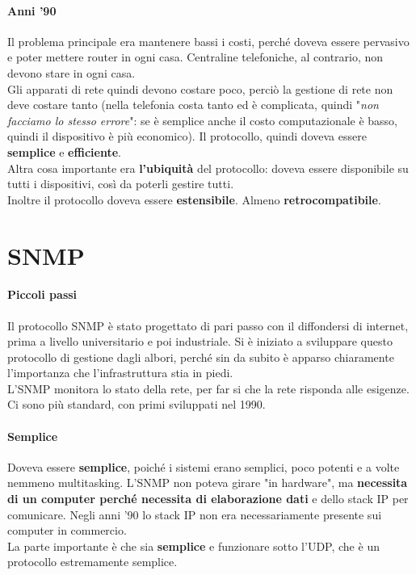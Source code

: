 \documentclass[10pt]{book}
\begin{document}
\paragraph{Anni '90} Il problema principale era mantenere bassi i costi, perché doveva essere pervasivo e poter mettere router in ogni casa. Centraline telefoniche, al contrario, non devono stare in ogni casa.\\
Gli apparati di rete quindi devono costare poco, perciò la gestione di rete non deve costare tanto (nella telefonia costa tanto ed è complicata, quindi "\textit{non facciamo lo stesso errore}": se è semplice anche il costo computazionale è basso, quindi il dispositivo è più economico). Il protocollo, quindi doveva essere \textbf{semplice} e \textbf{efficiente}.\\
Altra cosa importante era \textbf{l'ubiquità} del protocollo: doveva essere disponibile su tutti i dispositivi, così da poterli gestire tutti.\\
Inoltre il protocollo doveva essere \textbf{estensibile}. Almeno \textbf{retrocompatibile}.
\section{SNMP}
\paragraph{Piccoli passi} Il protocollo SNMP è stato progettato di pari passo con il diffondersi di internet, prima a livello universitario e poi industriale. Si è iniziato a sviluppare questo protocollo di gestione dagli albori, perché sin da subito è apparso chiaramente l'importanza che l'infrastruttura stia in piedi.\\
L'SNMP monitora lo stato della rete, per far si che la rete risponda alle esigenze. Ci sono più standard, con primi sviluppati nel 1990.
\paragraph{Semplice} Doveva essere \textbf{semplice}, poiché i sistemi erano semplici, poco potenti e a volte nemmeno multitasking. L'SNMP non poteva girare "in hardware", ma \textbf{necessita di un computer perché necessita di elaborazione dati} e dello stack IP per comunicare. Negli anni '90 lo stack IP non era necessariamente presente sui computer in commercio.\\
La parte importante è che sia \textbf{semplice} e funzionare sotto l'UDP, che è un protocollo estremamente semplice.
\end{document}

